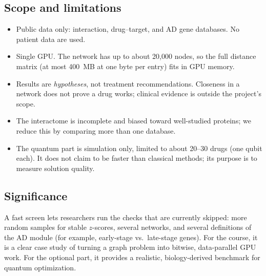 \subsection{Scope and limitations}

\begin{itemize}[nosep]
  \item Public data only: interaction, drug--target, and AD gene databases. No patient data are used.
  \item Single GPU. The network has up to about 20{,}000 nodes, so the full distance matrix (at most 400~MB at one byte per entry) fits in GPU memory.
  \item Results are \emph{hypotheses}, not treatment recommendations. Closeness in a network does not prove a drug works; clinical evidence is outside the project's scope.
  \item The interactome is incomplete and biased toward well-studied proteins; we reduce this by comparing more than one database.
  \item The quantum part is simulation only, limited to about 20--30 drugs (one qubit each). It does not claim to be faster than classical methods; its purpose is to measure solution quality.
\end{itemize}

\subsection{Significance}

A fast screen lets researchers run the checks that are currently skipped: more random samples for stable $z$-scores, several networks, and several definitions of the AD module (for example, early-stage vs.\ late-stage genes). For the course, it is a clear case study of turning a graph problem into bitwise, data-parallel GPU work. For the optional part, it provides a realistic, biology-derived benchmark for quantum optimization.
